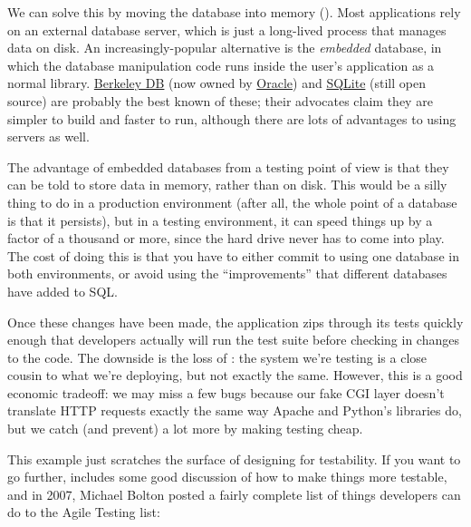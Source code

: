 \documentclass{report}
\begin{document}
We can solve this by moving the database into memory
().  Most applications rely on an
external database server, which is just a long-lived process that
manages data on disk. An increasingly-popular alternative is the
\emph{embedded} database, in which the database manipulation code runs
inside the user's application as a normal library.  \url{Berkeley DB}
(now owned by \url{Oracle}) and \url{SQLite} (still open source) are
probably the best known of these; their advocates claim they are
simpler to build and faster to run, although there are lots of
advantages to using servers as well.

\begin{figure}
\end{figure}

The advantage of embedded databases from a testing point of view is
that they can be told to store data in memory, rather than on
disk. This would be a silly thing to do in a production environment
(after all, the whole point of a database is that it persists), but in
a testing environment, it can speed things up by a factor of a
thousand or more, since the hard drive never has to come into
play. The cost of doing this is that you have to either commit to
using one database in both environments, or avoid using the
``improvements'' that different databases have added to SQL.

Once these changes have been made, the application zips through its
tests quickly enough that developers actually will run the test suite
before checking in changes to the code. The downside is the loss of
: the system we're testing is a close cousin to what
we're deploying, but not exactly the same. However, this is a good
economic tradeoff: we may miss a few bugs because our fake CGI layer
doesn't translate HTTP requests exactly the same way Apache and
Python's libraries do, but we catch (and prevent) a lot more by making
testing cheap.

This example just scratches the surface of designing for testability.
If you want to go further, \cite{b:meszaros-xunit} includes some good
discussion of how to make things more testable, and in 2007, Michael
Bolton posted a fairly complete list of things developers can do to
the Agile Testing list:
\end{document}
